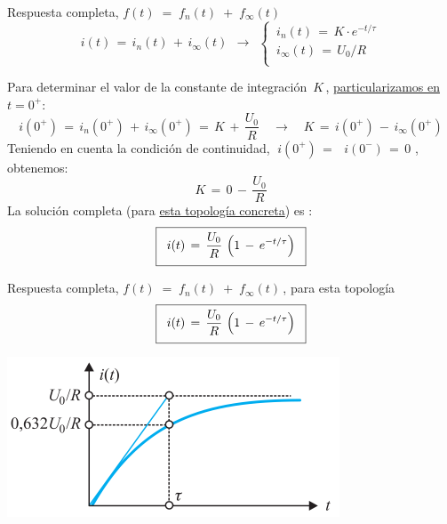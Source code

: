 \documentclass[aspectratio=169, usenames,svgnames,dvipsnames]{beamer}
\begin{document}

\begin{frame}{Respuesta completa, \hspace{3mm}$f(t) \;=\; f_n(t) \;+\; f_\infty(t)$}
    \begin{equation*}
        i(t) \,=\, i_n(t) \,+\, i_\infty(t) \;\,\rightarrow\;\,
        \begin{cases}
            \, i_n(t) \,=\, K \cdot e^{-t/\tau}\\[3pt]
            \, i_\infty(t) \,=\, U_0/R\\
        \end{cases}
    \end{equation*}
    
    Para \alert{determinar} el valor de la \alert{constante de integración} $\, K \,$, \hyperlink{diapo:CondicionesIniciales}{particularizamos en \(t = 0^+\)}:
    \begin{equation*}
        i(0^+) \,=\, i_n(0^+) \,+\, i_\infty(0^+) \,=\, K \,+\, \frac{U_0}{R} \quad\rightarrow\quad K \,=\, i(0^+) \,-\, i_\infty(0^+)
    \end{equation*}
    Teniendo en cuenta la \alert{condición de continuidad}, \(\; i(0^+) \,=\,\) \hyperlink{diapo:CondicionInicialRL}{\(\, i(0^-) \,=\, 0 \)} , obtenemos:
    \[
        K \,=\, 0 \,-\, \frac{U_0}{R}
    \]
    La \alert{solución completa} (para \underline{esta topología concreta}) es :
    \[
        \boxed{ \vphantom{\frac{\frac{a}{a}}{\frac{a}{a}}}\;\; i(t) \,=\, \frac{U_0}{R} \,\left(1 \,-\, e^{-t/\tau} \right) \;\;}
    \]
\end{frame}


\begin{frame}{Respuesta completa, \hspace{3mm}$f(t) \;=\; f_n(t) \;+\; f_\infty(t)\,$, \hspace{3mm}para esta topología} \label{diapo:RL_resultado}
    \Large
    \[
        \boxed{ \vphantom{\frac{\frac{a}{a}}{\frac{a}{a}}}\;\; i(t) \,=\, \frac{U_0}{R} \,\left(1 \,-\, e^{-t/\tau} \right) \;\;}
    \]
    
    \begin{center}
        \includegraphics[height=0.45\textheight]{../figs/RespuestaCompleta_RL.pdf}
    \end{center}
\end{frame}
\end{document}
